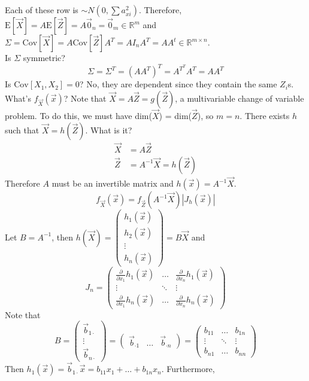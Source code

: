 \documentclass[12pt]{article}
\newcommand{\expected}[1]{\mathrm{E}[#1]}
\newcommand{\covariance}[1]{\mathrm{Cov}[#1]}
\begin{document}
Each of these row is $\sim N(0, \sum a_{xi}^2)$. Therefore, $\expected{\vec{X}} = A\expected{\vec{Z}} = A\vec{0}_n = \vec{0}_m \in \mathbb{R}^m$ and $\Sigma = \covariance{\vec{X}} = A\covariance{\vec{Z}}A^T = AI_nA^T = AA^t \in \mathbb{R}^{m \times n}$. \\ 
Is $\Sigma$ symmetric? $$ \Sigma = \Sigma^T = (AA^T)^T = A^{T^T}A^T = AA^T $$ 
Is $\covariance{X_1,X_2} = 0$? No, they are dependent since they contain the same $Z_i$s. What's $f_{\vec{X}}(\vec{x})$? Note that $\vec{X} = A\vec{Z} = g(\vec{Z})$, a multivariable change of variable problem. To do this, we must have dim($\vec{X}$) = dim($\vec{Z}$), so $m = n$. There exists $h$ such that $\vec{X} = h(\vec{Z})$. What is it? 
$$ \begin{aligned} \vec{X} &= A\vec{Z} \\ \vec{Z} &= A^{-1}\vec{X} = h(\vec{Z}) \end{aligned} $$ 
Therefore $A$ must be an invertible matrix and $h(\vec{x}) = A^{-1}\vec{X}$. 
$$ f_{\vec{X}}(\vec{x}) = f_{\vec{Z}}(A^{-1}\vec{X})|J_h(\vec{x})| $$ 
Let $B = A^{-1}$, then $h(\vec{X}) = \begin{pmatrix} h_1(\vec{x}) \\ h_2(\vec{x}) \\ \vdots \\ h_n(\vec{x}) \end{pmatrix} = B\vec{X} $ and 
$$ J_n = \begin{pmatrix} \frac{\partial}{\partial x_1} h_1(\vec{x}) & \dots & \frac{\partial}{\partial x_n} h_1(\vec{x}) \\ \vdots & \ddots & \vdots \\ \frac{\partial}{\partial x_1} h_n(\vec{x}) & \dots & \frac{\partial}{\partial x_n} h_n(\vec{x}) \end{pmatrix} $$ Note that $$B = \begin{pmatrix} \vec{b}_{1\cdot} \\ \vdots \\ \vec{b}_{n\cdot} \end{pmatrix} = \begin{pmatrix} \vec{b}_{\cdot 1} & \dots & \vec{b}_{\cdot n} \end{pmatrix} =  \begin{pmatrix} b_{11} & \dots & b_{1n} \\ \vdots & \ddots & \vdots \\ b_{n1} & \dots & b_{nn} \end{pmatrix} $$ 
Then $h_1(\vec{x}) = \vec{b}_{1\cdot} \vec{x} = b_{11}x_1 + \dots + b_{1n}x_n$. Furthermore, 
\end{document}
